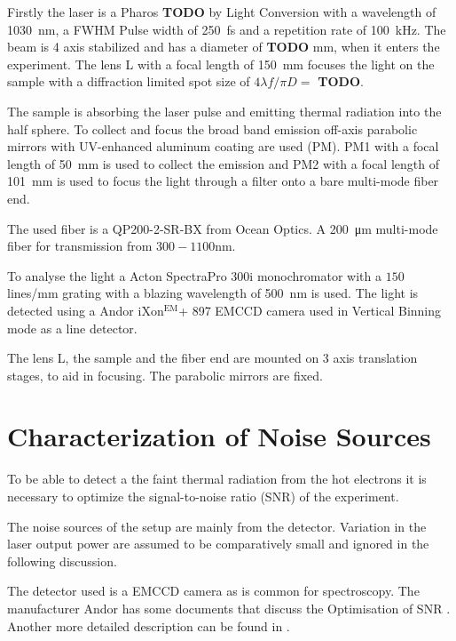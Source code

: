 \documentclass[
	parskip=half,
	a4paper,
]{scrarticle}
\begin{document}
Firstly the laser is a Pharos \textbf{TODO} by Light Conversion with a wavelength of \SI{1030}{nm}, a FWHM Pulse width of \SI{250}{fs} and a repetition rate of \SI{100}{kHz}.
The beam is 4 axis stabilized and has a diameter of \textbf{TODO} \si{mm}, when it enters the experiment.
The lens \textsf{L} with a focal length of \SI{150}{mm} focuses the light on the sample with a diffraction limited spot size of $4 \lambda f / \pi D = $ \textbf{TODO}.

The sample is absorbing the laser pulse and emitting thermal radiation into the half sphere.
To collect and focus the broad band emission off-axis parabolic mirrors with  UV-enhanced aluminum coating are used (\textsf{PM}).
\textsf{PM1} with a focal length of \SI{50}{mm} is used to collect the emission and \textsf{PM2} with a focal length of \SI{101}{mm} is used to focus the light through a filter onto a bare multi-mode fiber end.

The used fiber is a QP200-2-SR-BX from Ocean Optics. A \SI{200}{\micro m} multi-mode fiber for transmission from $300-1100$\;\si{nm}.

To analyse the light a Acton SpectraPro 300i monochromator with a $150$\;lines/mm grating with a blazing wavelength of \SI{500}{nm} is used.
The light is detected using a Andor iXon$^\text{EM}$+ 897 EMCCD camera used in Vertical Binning mode as a line detector.

The lens \textsf{L}, the sample and the fiber end are mounted on 3 axis translation stages, to aid in focusing. The parabolic mirrors are fixed.

\section{Characterization of Noise Sources}
To be able to detect a the faint thermal radiation from the hot electrons it is necessary to optimize the signal-to-noise ratio (SNR) of the experiment.

The noise sources of the setup are mainly from the detector.
Variation in the laser output power are assumed to be comparatively small and ignored in the following discussion.

The detector used is a EMCCD camera as is common for spectroscopy. The manufacturer Andor has some documents that discuss the Optimisation of SNR \cite{andor_establishing_nodate,dr_jo_walters_sensitivity_2023}.
Another more detailed description can be found in \autocite{european_machine_vision_association_standard_2010}.
\end{document}
